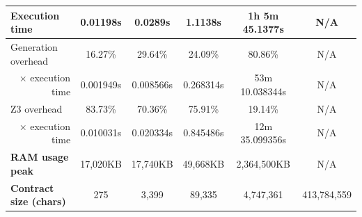 \documentclass[english,runningheads]{llncs}
\begin{document}
\begin{table}[]
{\begin{tabular}{l||lllll}
\textbf{Execution time}                & \multicolumn{1}{c|}{0.01198s}   & \multicolumn{1}{c|}{0.0289s}   & \multicolumn{1}{c|}{1.1138s}   & \multicolumn{1}{c|}{1h 5m 45.1377s} & \multicolumn{1}{c}{\color[HTML]{888888} N/A} \\ \hline
Generation overhead                    & \multicolumn{1}{c|}{16.27\%}    & \multicolumn{1}{c|}{29.64\%}   & \multicolumn{1}{c|}{24.09\%}   & \multicolumn{1}{c|}{80.86\%}        & \multicolumn{1}{c}{\color[HTML]{888888} N/A} \\ \hline
\multicolumn{1}{r||}{× execution time} & \multicolumn{1}{c|}{0.001949s}  & \multicolumn{1}{c|}{0.008566s} & \multicolumn{1}{c|}{0.268314s} & \multicolumn{1}{c|}{53m 10.038344s} & \multicolumn{1}{c}{\color[HTML]{888888} N/A} \\ \hline
Z3 overhead                            & \multicolumn{1}{c|}{83.73\%}    & \multicolumn{1}{c|}{70.36\%}   & \multicolumn{1}{c|}{75.91\%}   & \multicolumn{1}{c|}{19.14\%}        & \multicolumn{1}{c}{\color[HTML]{888888} N/A} \\ \hline
\multicolumn{1}{r||}{× execution time} & \multicolumn{1}{c|}{0.010031s}  & \multicolumn{1}{c|}{0.020334s} & \multicolumn{1}{c|}{0.845486s} & \multicolumn{1}{c|}{12m 35.099356s} & \multicolumn{1}{c}{\color[HTML]{888888} N/A} \\ \hline
\textbf{RAM usage peak}                & \multicolumn{1}{c|}{17,020KB}   & \multicolumn{1}{c|}{17,740KB}  & \multicolumn{1}{c|}{49,668KB}  & \multicolumn{1}{c|}{2,364,500KB}    & \multicolumn{1}{c}{\color[HTML]{888888} N/A} \\ \hline \hline
\textbf{Contract size (chars)}         & \multicolumn{1}{c|}{275}        & \multicolumn{1}{c|}{3,399}     & \multicolumn{1}{c|}{89,335}    & \multicolumn{1}{c|}{4,747,361}      & \multicolumn{1}{c}{413,784,559}
\end{tabular}
}
\end{table}
\end{document}
